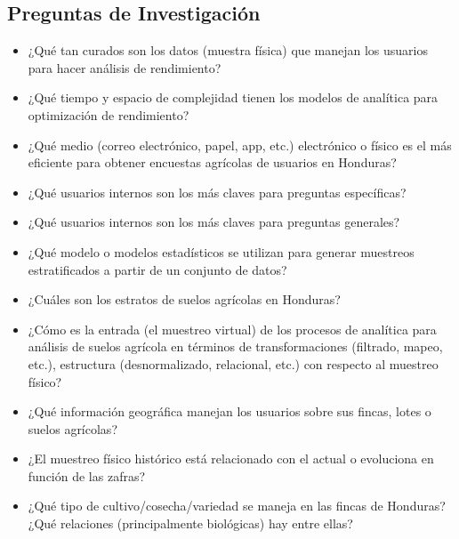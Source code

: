 \documentclass[conference]{IEEEtran}
\begin{document}
\subsection{Preguntas de Investigación}

\begin{itemize}
    \item ¿Qué tan curados son los datos (muestra física) que manejan los usuarios para hacer análisis de rendimiento?
    
    \item ¿Qué tiempo y espacio de complejidad tienen los modelos de analítica para optimización de rendimiento?
    
    \item ¿Qué medio (correo electrónico, papel, app, etc.) electrónico o físico es el más eficiente para obtener encuestas agrícolas de usuarios en Honduras?
    
    \item ¿Qué usuarios internos son los más claves para preguntas específicas?
    
    \item ¿Qué usuarios internos son los más claves para preguntas generales?
    
    \item ¿Qué modelo o modelos estadísticos se utilizan para generar muestreos estratificados a partir de un conjunto de datos?
    
    \item ¿Cuáles son los estratos de suelos agrícolas en Honduras?
    
    \item ¿Cómo es la entrada (el muestreo virtual) de los procesos de analítica para análisis de suelos agrícola en términos de transformaciones (filtrado, mapeo, etc.), estructura (desnormalizado, relacional, etc.) con respecto al muestreo físico?
    
    \item ¿Qué información geográfica manejan los usuarios sobre sus fincas, lotes o suelos agrícolas?
    
    \item ¿El muestreo físico histórico está relacionado con el actual o evoluciona en función de las zafras?
    
    \item ¿Qué tipo de cultivo/cosecha/variedad se maneja en las fincas de Honduras? ¿Qué relaciones (principalmente biológicas) hay entre ellas?
\end{itemize}
\end{document}
